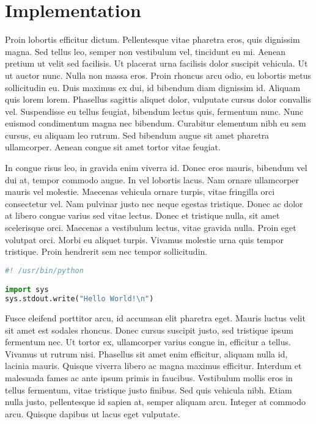 \documentclass{article}
\begin{document}
\section{Implementation}

Proin lobortis efficitur dictum. Pellentesque vitae pharetra eros, quis dignissim magna. Sed tellus leo, semper non vestibulum vel, tincidunt eu mi. Aenean pretium ut velit sed facilisis. Ut placerat urna facilisis dolor suscipit vehicula. Ut ut auctor nunc. Nulla non massa eros. Proin rhoncus arcu odio, eu lobortis metus sollicitudin eu. Duis maximus ex dui, id bibendum diam dignissim id. Aliquam quis lorem lorem. Phasellus sagittis aliquet dolor, vulputate cursus dolor convallis vel. Suspendisse eu tellus feugiat, bibendum lectus quis, fermentum nunc. Nunc euismod condimentum magna nec bibendum. Curabitur elementum nibh eu sem cursus, eu aliquam leo rutrum. Sed bibendum augue sit amet pharetra ullamcorper. Aenean congue sit amet tortor vitae feugiat.

In congue risus leo, in gravida enim viverra id. Donec eros mauris, bibendum vel dui at, tempor commodo augue. In vel lobortis lacus. Nam ornare ullamcorper mauris vel molestie. Maecenas vehicula ornare turpis, vitae fringilla orci consectetur vel. Nam pulvinar justo nec neque egestas tristique. Donec ac dolor at libero congue varius sed vitae lectus. Donec et tristique nulla, sit amet scelerisque orci. Maecenas a vestibulum lectus, vitae gravida nulla. Proin eget volutpat orci. Morbi eu aliquet turpis. Vivamus molestie urna quis tempor tristique. Proin hendrerit sem nec tempor sollicitudin.

\begin{file}[hello.py]
\begin{lstlisting}[language=Python]
#! /usr/bin/python

import sys
sys.stdout.write("Hello World!\n")
\end{lstlisting}
\end{file}

Fusce eleifend porttitor arcu, id accumsan elit pharetra eget. Mauris luctus velit sit amet est sodales rhoncus. Donec cursus suscipit justo, sed tristique ipsum fermentum nec. Ut tortor ex, ullamcorper varius congue in, efficitur a tellus. Vivamus ut rutrum nisi. Phasellus sit amet enim efficitur, aliquam nulla id, lacinia mauris. Quisque viverra libero ac magna maximus efficitur. Interdum et malesuada fames ac ante ipsum primis in faucibus. Vestibulum mollis eros in tellus fermentum, vitae tristique justo finibus. Sed quis vehicula nibh. Etiam nulla justo, pellentesque id sapien at, semper aliquam arcu. Integer at commodo arcu. Quisque dapibus ut lacus eget vulputate.
\end{document}
